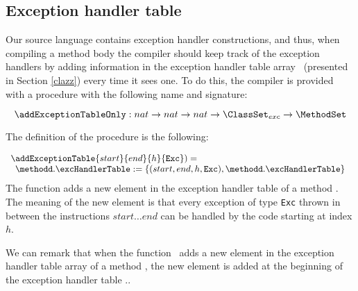 
\subsection{Exception handler table}\label{pogEq:compile:excHandlers}

Our source language contains exception handler constructions, and thus, when compiling a method body
the compiler should keep track of the exception handlers by adding information 
in the exception handler table array \excHandlerTable \ (presented in Section \ref{clazz})   every time it sees one.
 To do this, the compiler is provided with a procedure with the following name and signature:

$$ \addExceptionTableOnly : nat \rightarrow nat \rightarrow nat \rightarrow  \ClassSet_{exc}  \rightarrow    \MethodSet  $$
	
The definition of the procedure is the following:

$$ \begin{array}{l}
  \addExceptionTable{ start }{ end  }{ h}{  \mbox{\rm\texttt{Exc}} } ) = \\
   \begin{array}{l}
         \methodd.\excHandlerTable := \{ (start, end, h,  \mbox{\rm\texttt{Exc}}   ) , \methodd.\excHandlerTable \}

   \end{array}
\end{array}$$
The function adds a  new element in the exception handler table
of a method \methodd. The meaning of the new element is that 
every exception of type \mbox{\rm\texttt{Exc}}  thrown in between the instructions $start \ldots end$ can be handled by 
the code starting at index $h$.

We can remark that when the function  \addExceptionTableOnly \  adds a new element in the exception handler table array
of a method \methodd, the new element is added at the beginning of the  exception handler table   \methodd.\excHandlerTable.

